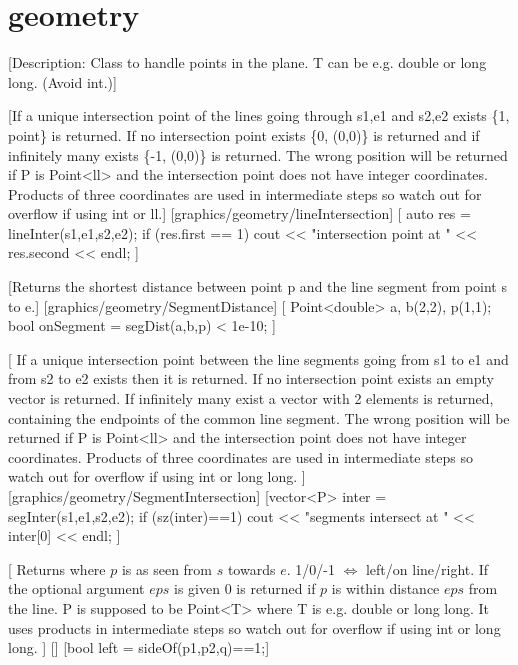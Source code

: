 \chapter{geometry}

[Description: Class to handle points in the plane. T can be e.g. double or long long. (Avoid int.)]

%
[If a unique intersection point of the lines going through s1,e1 and s2,e2 exists \{1, point\} is returned. 
If no intersection point exists \{0, (0,0)\} is returned and if infinitely many exists \{-1, (0,0)\} is returned. 
The wrong position will be returned if P is Point<ll> and the intersection point does not have integer coordinates. 
Products of three coordinates are used in intermediate steps so watch out for overflow if using int or ll.]%
[graphics/geometry/lineIntersection]
[
    auto res = lineInter(s1,e1,s2,e2);
 	if (res.first == 1)
		cout << "intersection point at " << res.second << endl;
]

[Returns the shortest distance between point p and the line segment from point s to e.]
[graphics/geometry/SegmentDistance]
[
    Point<double> a, b(2,2), p(1,1);
 	bool onSegment = segDist(a,b,p) < 1e-10;
]

[
If a unique intersection point between the line segments going from s1 to e1 and from s2 to e2 exists then it is returned.
If no intersection point exists an empty vector is returned.
If infinitely many exist a vector with 2 elements is returned, containing the endpoints of the common line segment.
The wrong position will be returned if P is Point<ll> and the intersection point does not have integer coordinates.
Products of three coordinates are used in intermediate steps so watch out for overflow if using int or long long.
]
[graphics/geometry/SegmentIntersection]
[vector<P> inter = segInter(s1,e1,s2,e2);
 if (sz(inter)==1)
   cout << "segments intersect at " << inter[0] << endl;
]

[
 Returns where $p$ is as seen from $s$ towards $e$. 1/0/-1 $\Leftrightarrow$ left/on line/right.
 If the optional argument $eps$ is given 0 is returned if $p$ is within distance $eps$ from the line.
 P is supposed to be Point<T> where T is e.g. double or long long.
 It uses products in intermediate steps so watch out for overflow if using int or long long.
]
[]
[bool left = sideOf(p1,p2,q)==1;]

